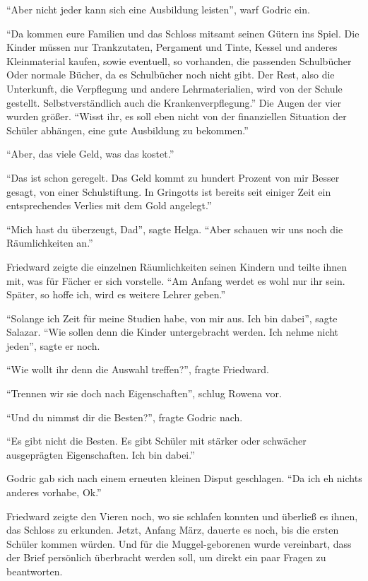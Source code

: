 \enquote{Aber nicht jeder kann sich eine Ausbildung leisten}, warf Godric ein.

\enquote{Da kommen eure Familien und das Schloss mitsamt seinen Gütern ins Spiel. Die Kinder müssen nur Trankzutaten, Pergament und Tinte, Kessel und anderes Kleinmaterial kaufen, sowie eventuell, so vorhanden, die passenden Schulbücher \gst Oder normale Bücher, da es Schulbücher noch nicht gibt. \gst Der Rest, also die Unterkunft, die Verpflegung und andere Lehrmaterialien, wird von der Schule gestellt. Selbstverständlich auch die Krankenverpflegung.} Die Augen der vier wurden größer. \enquote{Wisst ihr, es soll eben nicht von der finanziellen Situation der Schüler abhängen, eine gute Ausbildung zu bekommen.}

\enquote{Aber, das viele Geld, was das kostet.}

\enquote{Das ist schon geregelt. Das Geld kommt zu hundert Prozent von mir \gst Besser gesagt, von einer Schulstiftung. In Gringotts ist bereits seit einiger Zeit ein entsprechendes Verlies mit dem Gold angelegt.}

\enquote{Mich hast du überzeugt, Dad}, sagte Helga. \enquote{Aber schauen wir uns noch die Räumlichkeiten an.}

Friedward zeigte die einzelnen Räumlichkeiten seinen Kindern und teilte ihnen mit, was für Fächer er sich vorstelle. \enquote{Am Anfang werdet es wohl nur ihr sein. Später, so hoffe ich, wird es weitere Lehrer geben.}

\enquote{Solange ich Zeit für meine Studien habe, von mir aus. Ich bin dabei}, sagte Salazar. \enquote{Wie sollen denn die Kinder untergebracht werden. Ich nehme nicht jeden}, sagte er noch.

\enquote{Wie wollt ihr denn die Auswahl treffen?}, fragte Friedward.

\enquote{Trennen wir sie doch nach Eigenschaften}, schlug Rowena vor.

\enquote{Und du nimmst dir die Besten?}, fragte Godric nach.

\enquote{Es gibt nicht die Besten. Es gibt Schüler mit stärker oder schwächer ausgeprägten Eigenschaften. \gst Ich bin dabei.}

Godric gab sich nach einem erneuten kleinen Disput geschlagen. \enquote{Da ich eh nichts anderes vorhabe, Ok.}

Friedward zeigte den Vieren noch, wo sie schlafen konnten und überließ es ihnen, das Schloss zu erkunden. Jetzt, Anfang März, dauerte es noch, bis die ersten Schüler kommen würden. Und für die Muggel-geborenen wurde vereinbart, dass der Brief persönlich überbracht werden soll, um direkt ein paar Fragen zu beantworten.

